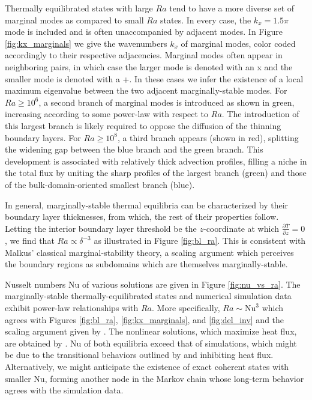 \documentclass[reprint,amsmath,amssymb,aps]{revtex4-1}
\newcommand\Nu{\mathrm{Nu}}
\begin{document}
Thermally equilibrated states with large $Ra$ tend to have a more diverse set of marginal modes as compared to small $Ra$ states. 
In every case, the $k_x = 1.5\pi$ mode is included and is often unaccompanied by adjacent modes. 
In Figure \ref{fig:kx_marginals} we give the wavenumbers $k_x$ of marginal modes, color coded accordingly to their respective adjacencies. 
Marginal modes often appear in neighboring pairs, in which case the larger mode is denoted with an x and the smaller mode is denoted with a +. 
In these cases we infer the existence of a local maximum eigenvalue between the two adjacent marginally-stable modes. 
For $Ra \geq 10^6$, a second branch of marginal modes is introduced as shown in green, increasing according to some power-law with respect to $Ra$. 
The introduction of this largest branch is likely required to oppose the diffusion of the thinning boundary layers. 
For $Ra \geq 10^8$, a third branch appears (shown in red), splitting the widening gap between the blue branch and the green branch. 
This development is associated with relatively thick advection profiles, filling a niche in the total flux by uniting the sharp profiles of the largest branch (green) and those of the bulk-domain-oriented smallest branch (blue).

In general, marginally-stable thermal equilibria can be characterized by their boundary layer thicknesses, from which, the rest of their properties follow. Letting the interior boundary layer threshold be the $z$-coordinate at which $\frac{\partial \bar{T}}{\partial z} = 0$, we find that $Ra \propto  \delta^{-3}$ as illustrated in Figure \ref{fig:bl_ra}. 
This is consistent with Malkus' classical marginal-stability theory, a scaling argument which perceives the boundary regions as subdomains which are themselves marginally-stable.

Nusselt numbers $\Nu$ of various solutions are given in Figure \ref{fig:nu_vs_ra}. 
The marginally-stable thermally-equilibrated states and numerical simulation data exhibit power-law relationships with $Ra$. 
More specifically, $Ra \sim \Nu^3$ which agrees with Figures \ref{fig:bl_ra}, \ref{fig:kx_marginals}, and \ref{fig:del_inv} and the scaling argument given by \cite{Malkus_1954}. 
The nonlinear solutions, which maximize heat flux, are obtained by \cite{Waleffe}. 
$\Nu$ of both equilibria exceed that of simulations, which might be due to the transitional behaviors outlined by \cite{Yalniz} and \cite{Cvitanovic} inhibiting heat flux. 
Alternatively, we might anticipate the existence of exact coherent states with smaller $\Nu$, forming another node in the Markov chain whose long-term behavior agrees with the simulation data.
\end{document}
